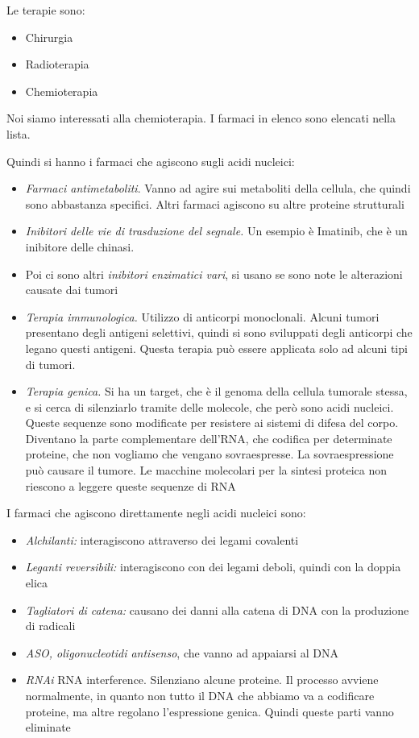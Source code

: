 Le terapie sono: 
\begin{itemize}
\item Chirurgia 
\item Radioterapia
\item Chemioterapia
\end{itemize}

Noi siamo interessati alla chemioterapia. I farmaci in elenco sono
elencati nella lista.

Quindi si hanno i farmaci che agiscono sugli acidi nucleici:

\begin{itemize}
\item \emph{Farmaci antimetaboliti}. Vanno ad agire sui metaboliti della cellula, che
quindi sono abbastanza specifici.
Altri farmaci agiscono su altre proteine strutturali
\item \emph{Inibitori delle vie di trasduzione del segnale.} Un esempio è Imatinib, che è un inibitore
delle chinasi.
\item Poi ci sono altri \emph{inibitori enzimatici vari}, si usano se sono note le
alterazioni causate dai tumori
\item \emph{Terapia immunologica.} Utilizzo di anticorpi monoclonali. Alcuni tumori
presentano degli antigeni selettivi, quindi si sono sviluppati degli
anticorpi che legano questi antigeni. Questa terapia può essere
applicata solo ad alcuni tipi di tumori.
\item \emph{Terapia genica.} Si ha un target, che è il genoma della cellula tumorale
stessa, e si cerca di silenziarlo tramite delle molecole, che però sono
acidi nucleici. Queste sequenze sono modificate per resistere ai sistemi
di difesa del corpo. Diventano la parte complementare dell'RNA, che
codifica per determinate proteine, che non vogliamo che vengano
sovraespresse. La sovraespressione può causare il tumore. Le macchine
molecolari per la sintesi proteica non riescono a leggere queste
sequenze di RNA
\end{itemize}


I farmaci che agiscono direttamente negli acidi nucleici sono:
\begin{itemize}
\item \emph{Alchilanti:} interagiscono attraverso dei legami covalenti
\item \emph{Leganti reversibili:} interagiscono con dei legami deboli, quindi con la 
doppia elica 
\item \emph{Tagliatori di catena:} causano dei danni alla catena di DNA con
la produzione di radicali 
\item \emph{ASO, oligonucleotidi antisenso}, che vanno ad
appaiarsi al DNA
\item  \emph{RNAi} RNA interference. Silenziano alcune proteine. Il
processo avviene normalmente, in quanto non tutto il DNA che abbiamo va
a codificare proteine, ma altre regolano l'espressione genica. Quindi
queste parti vanno eliminate
\end{itemize}

